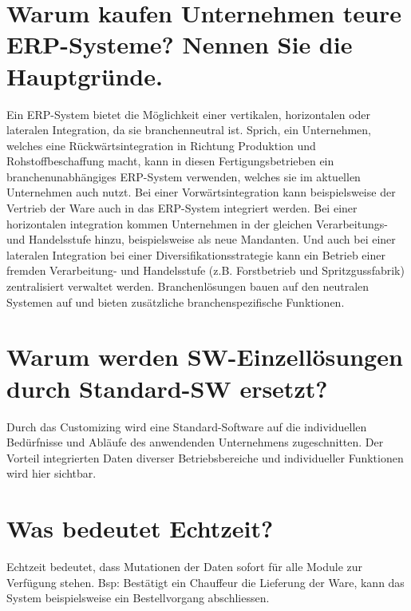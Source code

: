\section{Warum kaufen Unternehmen teure ERP-Systeme? Nennen Sie die Hauptgründe.}
Ein ERP-System bietet die Möglichkeit einer vertikalen, horizontalen oder lateralen Integration, da sie branchenneutral ist. Sprich, ein Unternehmen, welches eine Rückwärtsintegration in Richtung Produktion und Rohstoffbeschaffung macht, kann in diesen Fertigungsbetrieben ein branchenunabhängiges ERP-System verwenden, welches sie im aktuellen Unternehmen auch nutzt. Bei einer Vorwärtsintegration kann beispielsweise der Vertrieb der Ware auch in das ERP-System integriert werden. Bei einer horizontalen integration kommen Unternehmen in der gleichen Verarbeitungs- und Handelsstufe hinzu, beispielsweise als neue Mandanten. Und auch bei einer lateralen Integration bei einer Diversifikationsstrategie kann ein Betrieb einer fremden Verarbeitung- und Handelsstufe (z.B. Forstbetrieb und Spritzgussfabrik) zentralisiert verwaltet werden. Branchenlösungen bauen auf den neutralen Systemen auf und bieten zusätzliche branchenspezifische Funktionen.

\section{Warum werden SW-Einzellösungen durch Standard-SW ersetzt?}
Durch das Customizing wird eine Standard-Software auf die individuellen Bedürfnisse und Abläufe des anwendenden Unternehmens zugeschnitten. Der Vorteil integrierten Daten diverser Betriebsbereiche und individueller Funktionen wird hier sichtbar.

\section{Was bedeutet Echtzeit?}
Echtzeit bedeutet, dass Mutationen der Daten sofort für alle Module zur Verfügung stehen. Bsp: Bestätigt ein Chauffeur die Lieferung der Ware, kann das System beispielsweise ein Bestellvorgang abschliessen.